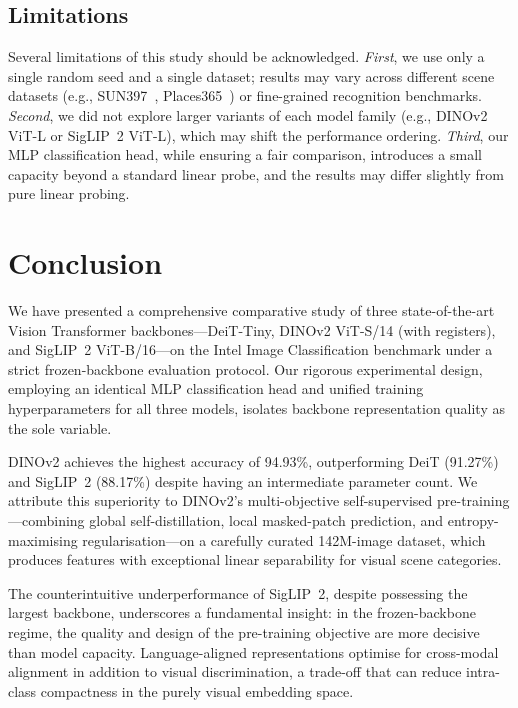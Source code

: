 \documentclass[journal]{IEEEtran}
\begin{document}
\subsection{Limitations}
Several limitations of this study should be acknowledged. \textit{First}, we use only a
single random seed and a single dataset; results may vary across different scene datasets
(e.g., SUN397~\cite{xiao2010sun}, Places365~\cite{zhou2018places}) or fine-grained
recognition benchmarks. \textit{Second}, we did not explore larger variants of each
model family (e.g., DINOv2 ViT-L or SigLIP~2 ViT-L), which may shift the performance
ordering. \textit{Third}, our MLP classification head, while ensuring a fair comparison,
introduces a small capacity beyond a standard linear probe, and the results may differ
slightly from pure linear probing.

\section{Conclusion}
\label{sec:conclusion}

We have presented a comprehensive comparative study of three state-of-the-art
Vision Transformer backbones—DeiT-Tiny, DINOv2 ViT-S/14 (with registers), and
SigLIP~2 ViT-B/16—on the Intel Image Classification benchmark under a strict
frozen-backbone evaluation protocol. Our rigorous experimental design, employing
an identical MLP classification head and unified training hyperparameters for all
three models, isolates backbone representation quality as the sole variable.

DINOv2 achieves the highest accuracy of 94.93\%, outperforming DeiT (91.27\%) and
SigLIP~2 (88.17\%) despite having an intermediate parameter count. We attribute
this superiority to DINOv2's multi-objective self-supervised pre-training—combining
global self-distillation, local masked-patch prediction, and entropy-maximising
regularisation—on a carefully curated 142M-image dataset, which produces features
with exceptional linear separability for visual scene categories.

The counterintuitive underperformance of SigLIP~2, despite possessing the largest
backbone, underscores a fundamental insight: in the frozen-backbone regime, the
quality and design of the pre-training objective are more decisive than model capacity.
Language-aligned representations optimise for cross-modal alignment in addition to
visual discrimination, a trade-off that can reduce intra-class compactness in the
purely visual embedding space.
\end{document}
